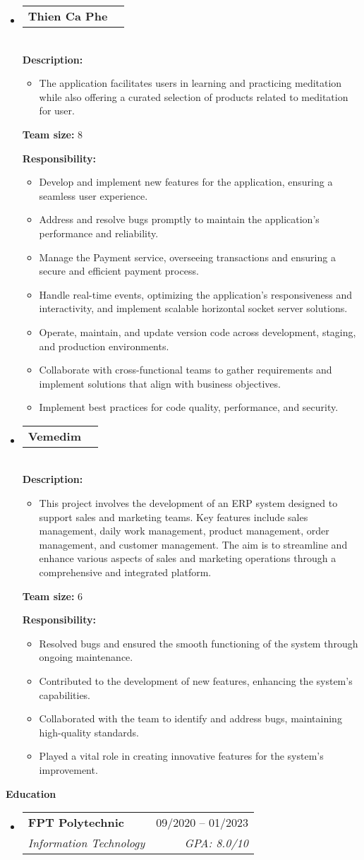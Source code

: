 \documentclass[letterpaper,12pt]{article}[leftmargin=*]
\makeatletter
\def \entryspacing {-0pt}
\renewcommand{\section}[2]{\vspace{5pt}
  \colorbox{secondary}{\color{white}\raggedbottom\normalsize\textbf{{#1}{\hspace{7pt}#2}}}
}
\newcommand{\resumeEntryStart}{\begin{itemize}[leftmargin=2.5mm]}
\newcommand{\resumeEntryEnd}{\end{itemize}\vspace{\entryspacing}}
\newcommand{\resumeItemListStart}{\begin{itemize}[leftmargin=4.5mm]}
\newcommand{\resumeItemListEnd}{\end{itemize}}
\newcommand{\resumeItem}[1]{
  \item\small{
    {#1 \vspace{-2pt}}
  }
}
\newcommand{\resumeEntryTSDL}[4]{
  \vspace{-1pt}\item[]
    \begin{tabularx}{0.97\textwidth}{X@{\hspace{60pt}}r}
      \textbf{\color{primary}#1} & {\firabook\color{accent}\small#2} \\
      \textit{\color{accent}\small#3} & \textit{\color{accent}\small#4} \\
    \end{tabularx}\vspace{-6pt}
}
\newcommand{\resumeEntryTD}[2]{
  \vspace{-1pt}\item[]
    \begin{tabularx}{0.97\textwidth}{X@{\hspace{60pt}}r}
      \textbf{\color{primary}#1} & {\firabook\color{accent}\small#2} \\
    \end{tabularx}\vspace{-6pt}
}
\makeatother
\begin{document}
  \resumeEntryStart
    \resumeEntryTD
      {Thien Ca Phe}{}

        \textbf{\\Description: }
        
            \resumeItemListStart
              \resumeItem {The application facilitates users in learning and practicing meditation while also offering a curated selection of products related to meditation for user.}
            \resumeItemListEnd


        \textbf{Team size: }8

  
        \textbf{Responsibility: }
            \resumeItemListStart
                \resumeItem{Develop and implement new features for the application, ensuring a seamless user experience.}
                \resumeItem{Address and resolve bugs promptly to maintain the application's performance and reliability.}
                \resumeItem{Manage the Payment service, overseeing transactions and ensuring a secure and efficient payment process.}
                \resumeItem{Handle real-time events, optimizing the application's responsiveness and interactivity, and implement scalable horizontal socket server solutions.}
                \resumeItem{Operate, maintain, and update version code across development, staging, and production environments.}
                \resumeItem{Collaborate with cross-functional teams to gather requirements and implement solutions that align with business objectives.}
                \resumeItem{Implement best practices for code quality, performance, and security.}
            \resumeItemListEnd
  \resumeEntryEnd


    \resumeEntryStart
    \resumeEntryTD
      {Vemedim}{}

        \textbf{\\Description: }
        
            \resumeItemListStart
              \resumeItem {This project involves the development of an ERP system designed to support sales and marketing teams. Key features include sales management, daily work management, product management, order management, and customer management. The aim is to streamline and enhance various aspects of sales and marketing operations through a comprehensive and integrated platform.}
            \resumeItemListEnd


        \textbf{Team size: }6

        
        \textbf{Responsibility: }
            \resumeItemListStart
                \resumeItem{Resolved bugs and ensured the smooth functioning of the system through ongoing maintenance.}
                \resumeItem{Contributed to the development of new features, enhancing the system's capabilities.}
                \resumeItem{Collaborated with the team to identify and address bugs, maintaining high-quality standards.}
                \resumeItem{Played a vital role in creating innovative features for the system's improvement.}
            \resumeItemListEnd
  \resumeEntryEnd

\section{\faGraduationCap}{Education}

  \resumeEntryStart
    \resumeEntryTSDL
      {FPT Polytechnic}{09/2020 -- 01/2023}
      {Information Technology}{GPA: 8.0/10}
  \resumeEntryEnd
\end{document}
